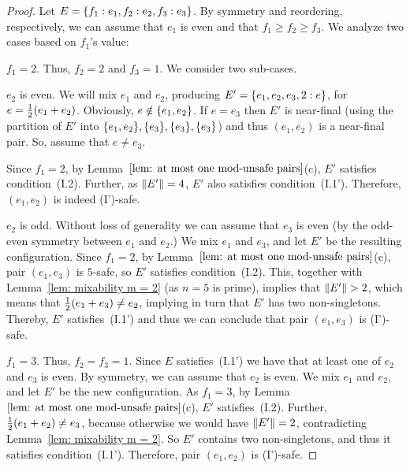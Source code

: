 \begin{proof}
	Let $E = { \left\{ f_1:e_1, f_2:e_2, f_3:e_3 \right\} }$.
	By symmetry and reordering, respectively, we can assume that $e_1$ is even
	and that $f_1\geq f_2 \geq f_3$.
	We analyze two cases based on $f_1$'s value:
	
	\smallskip\noindent
	 $f_1 = 2$. Thus, $f_2 = 2$ and $f_3 = 1$. We consider two sub-cases.

\vspace{-0.05in}
	
	\begin{description}
	
	\item{} $e_2$ is even.
	We will mix $e_1$ and $e_2$, producing $E'={ \left\{ e_1,e_2,e_3,2:e \right\} }$,
	for $e={\textstyle\frac{1}{2}}(e_1+e_2)$. Obviously, $e\notin{ \left\{ e_1,e_2 \right\} }$. 
	If $e=e_3$ then $E'$ is near-final
	(using the partition of $E'$ into ${ \left\{ e_1,e_2 \right\} },{ \left\{ e_3 \right\} },{ \left\{ e_3 \right\} },{ \left\{ e_3 \right\} }$)
	and thus $(e_1,e_2)$ is a near-final pair.
	So, assume that $e\neq e_3$.	
    
	Since $f_1 = 2$, by Lemma~$\ref{lem: at most one mod-unsafe pairs}$(c), $E'$
	satisfies condition~(I.2). Further, as ${\|E'\|} = 4$,
	$E'$ also satisfies condition~(I.1').
	Therefore, $(e_1,e_2)$ is indeed (I')-safe.
	
	\item{} $e_2$ is odd.
	Without loss of generality we can assume that $e_3$ is even (by the odd-even symmetry
	between $e_1$ and $e_2$.)
	We mix $e_1$ and $e_3$, and let $E'$ be the resulting configuration.
	Since $f_1 = 2$, by Lemma~$\ref{lem: at most one mod-unsafe pairs}$(c), 
	pair $(e_1,e_3)$ is $5$-safe, so $E'$ satisfies condition~(I.2).
	This, together with Lemma~\ref{lem: mixability m = 2} (as $n = 5$ is prime),
	implies that ${\|E'\|} > 2$, which means that
	${\textstyle\frac{1}{2}}(e_1+e_3)\neq e_2$,
	implying in turn that $E'$ has two non-singletons.
	Thereby, $E'$ satisfies~(I.1') and thus we can conclude that pair $(e_1,e_3)$ is (I')-safe.
	
	\end{description}
	
	\smallskip\noindent
	 $f_1 = 3$. Thus, $f_2 = f_3 = 1$.
	Since $E$ satisfies~(I.1')
	we have that at least one of $e_2$ and $e_3$ is even. 
	By symmetry, we can assume that $e_2$ is even. We mix $e_1$ and $e_2$,
	and let $E'$ be the new configuration.
	As $f_1 = 3$, by Lemma~$\ref{lem: at most one mod-unsafe pairs}$(c), $E'$ satisfies~(I.2).
	Further, ${\textstyle\frac{1}{2}}(e_1+e_2)\neq e_3$, because otherwise we would have ${\|E'\|} = 2$,
	contradicting Lemma~\ref{lem: mixability m = 2}.
	So $E'$ contains two non-singletons, and thus it satisfies condition~(I.1').
	Therefore, pair $(e_1,e_2)$ is (I')-safe.	
\end{proof}

